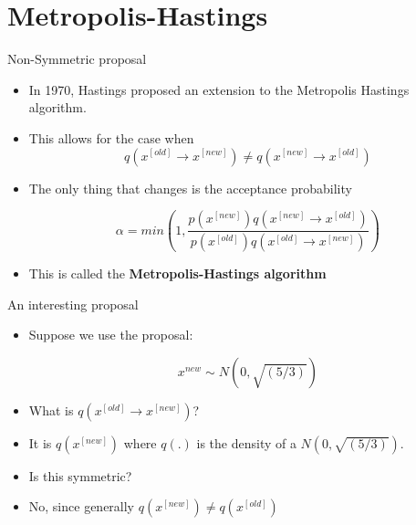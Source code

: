\documentclass[10pt]{beamer}
\begin{document}
\section{Metropolis-Hastings}
\begin{frame}{Non-Symmetric proposal}
\begin{itemize}
\item In 1970, Hastings proposed an extension to the Metropolis Hastings algorithm.

\item This allows for the case when
\begin{equation}
q(x^{[old]}\rightarrow x^{[new]})\neq q(x^{[new]}\rightarrow x^{[old]})
\end{equation}

\item The only thing that changes is the acceptance probability

\begin{equation}
\alpha=min\left(1,\frac{p(x^{[new]})q(x^{[new]}\rightarrow x^{[old]})}{p(x^{[old]})q(x^{[old]}\rightarrow x^{[new]})}\right)
\end{equation}

\item This is called the {\bf Metropolis-Hastings algorithm }
\end{itemize}
\end{frame}
\begin{frame}{An interesting proposal}
\begin{itemize}
\item Suppose we use the proposal:

\begin{equation}
x^{new}\sim N(0,\sqrt{(5/3)})
\end{equation}

\item What is $q(x^{[old]}\rightarrow x^{[new]})$?

\item It is $q(x^{[new]})$ where $q(.)$ is the density of a  $N(0,\sqrt{(5/3)})$.

\item Is this symmetric?

\item No, since generally $q(x^{[new]})\neq q(x^{[old]})$
\end{itemize}
\end{frame}
\end{document}
